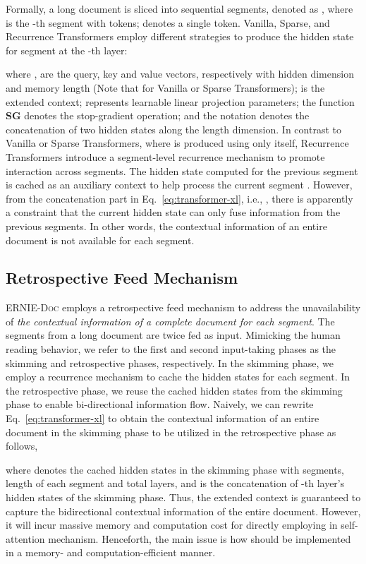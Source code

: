 \documentclass[11pt,a4paper]{article}
\newcommand{\mname}{\textsc{ERNIE-Doc}\xspace}
\begin{document}
Formally, a long document  is sliced into  sequential segments, denoted as , where  is the -th segment with  tokens;  denotes a single token. Vanilla, Sparse, and Recurrence Transformers employ different strategies to produce the hidden state  for segment  at the -th layer:

\begin{small}

\end{small}
where ,  are the query, key and value vectors, respectively with hidden dimension  and memory length  (Note that  for Vanilla or Sparse Transformers);  is the extended context;  represents learnable linear projection parameters; the function \textbf{SG} denotes the stop-gradient operation; and the notation  denotes the concatenation of two hidden states along the length dimension. In contrast to Vanilla or Sparse Transformers, where  is produced using only itself, Recurrence Transformers introduce a segment-level recurrence mechanism to promote interaction across segments. The hidden state computed for the previous segment  is cached as an auxiliary context to help process the current segment . However, from the concatenation part in Eq.~\ref{eq:transformer-xl}, i.e., , there is apparently a constraint that the current hidden state can only fuse information from the previous segments. In other words, the contextual information of an entire document is not available for each segment.

\subsection{Retrospective Feed Mechanism}\label{sec:recur-input}

\mname employs a retrospective feed mechanism to address the unavailability of \textit{the contextual information of a complete document for each segment}. The segments from a long document are twice fed as input. Mimicking the human reading behavior, we refer to the first and second input-taking phases as the skimming and retrospective phases, respectively. In the skimming phase, we employ a recurrence mechanism to cache the hidden states for each segment. In the retrospective phase, we reuse the cached hidden states from the skimming phase to enable bi-directional information flow. Naively, we can rewrite Eq.~\ref{eq:transformer-xl} to obtain the contextual information of an entire document in the skimming phase to be utilized in the retrospective phase as follows,

where  denotes the cached hidden states in the skimming phase with  segments,  length of each segment and total  layers, and      is the concatenation of -th layer's hidden states of the skimming phase. Thus, the extended context  is guaranteed to capture the bidirectional contextual information of the entire document. However, it will incur massive memory and computation cost for directly employing  in self-attention mechanism. Henceforth, the main issue is how  should be implemented in a memory- and computation-efficient manner. 
\end{document}
